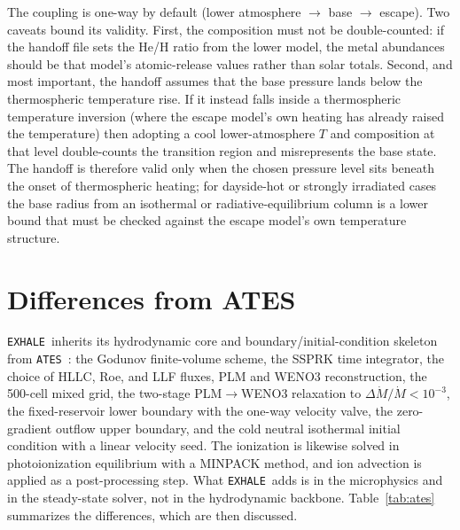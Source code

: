 \documentclass[twocolumn]{aastex702}
\newcommand{\EXHALE}{\texttt{EXHALE}}
\newcommand{\ATES}{\texttt{ATES}}
\newcommand{\Mdot}{\dot{M}}
\begin{document}
The coupling is one-way by default (lower atmosphere $\to$ base $\to$ escape). Two
caveats bound its validity. First, the composition must not be double-counted: if the
handoff file sets the He/H ratio from the lower model, the metal abundances should be that
model's atomic-release values rather than solar totals. Second, and most important, the
handoff assumes that the base pressure lands below the thermospheric temperature rise. If
it instead falls inside a thermospheric temperature inversion (where the escape model's
own heating has already raised the temperature) then adopting a cool lower-atmosphere
$T$ and composition at that level double-counts the transition region and misrepresents
the base state. The handoff is therefore valid only when the chosen pressure level sits
beneath the onset of thermospheric heating; for dayside-hot or strongly irradiated cases
the base radius from an isothermal or radiative-equilibrium column is a lower bound that
must be checked against the escape model's own temperature structure.

\section{Differences from ATES}
\label{sec:ates}

\EXHALE\ inherits its hydrodynamic core and boundary/initial-condition skeleton from
\ATES\ \citep{Caldiroli2021,Caldiroli2022}: the Godunov finite-volume scheme, the SSPRK
time integrator, the choice of HLLC, Roe, and LLF fluxes, PLM and WENO3
reconstruction, the 500-cell mixed grid, the two-stage PLM$\to$WENO3 relaxation to
$\Delta\Mdot/\Mdot<10^{-3}$, the fixed-reservoir lower boundary with the one-way velocity
valve, the zero-gradient outflow upper boundary, and the cold neutral isothermal initial
condition with a linear velocity seed. The ionization is likewise solved in
photoionization equilibrium with a MINPACK method, and ion advection is applied as a
post-processing step. What \EXHALE\ adds is in the microphysics and in the steady-state
solver, not in the hydrodynamic backbone. Table~\ref{tab:ates} summarizes the
differences, which are then discussed.
\end{document}
